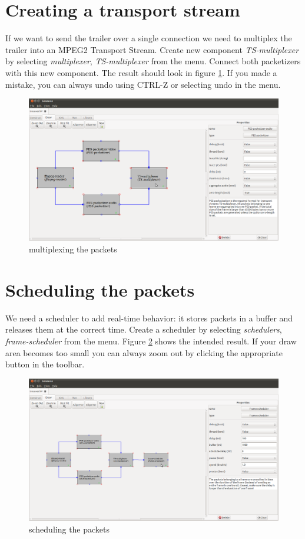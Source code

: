 \documentclass[12pt]{report}
\begin{document}
\section{Creating a transport stream}
If we want to send the trailer over a single connection we need to multiplex the trailer into an MPEG2 Transport Stream. Create new component \textit{TS-multiplexer} by selecting \textit{multiplexer}, \textit{TS-multiplexer} from the menu. Connect both packetizers with this new component. The result should look in figure \ref{fig:99}. If you made a mistake, you can always undo using CTRL-Z or selecting undo in the menu.
\begin{center}
\begin{figure}[!ht]
	\includegraphics[width=1.0\textwidth]{./images/ui99.png}
	\caption{multiplexing the packets}
	\label{fig:99}
\end{figure}
\end{center}
\newpage

\section{Scheduling the packets}
We need a scheduler to add real-time behavior: it stores packets in a buffer and releases them at the correct time. Create a scheduler by selecting \textit{schedulers}, \textit{frame-scheduler} from the menu. Figure \ref{fig:12} shows the intended result. If your draw area becomes too small you can always zoom out by clicking the appropriate button in the toolbar.
\begin{center}
\begin{figure}[!ht]
	\includegraphics[width=1.0\textwidth]{./images/ui07.png}
	\caption{scheduling the packets}
	\label{fig:12}
\end{figure}
\end{center}
\newpage
\end{document}
